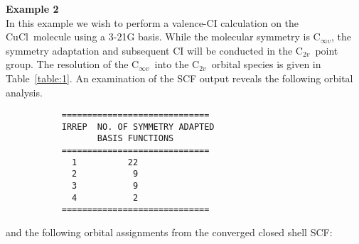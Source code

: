 \documentclass[11pt,fleqn]{article}
\newcommand{\cinfv}{\mbox{C$_{\infty v}$}}
\newcommand{\ctwov}{\mbox{C$_{2v}$}}
\newcommand{\cucl}{\mbox{CuCl}}
\begin{document}
{\bf Example 2}\\

In this example we wish to perform a valence-CI calculation on the \cucl\
molecule using a 3-21G  basis. While the molecular symmetry
is \cinfv, the symmetry adaptation  and subsequent CI 
will be conducted in the \ctwov\ point group. 
The resolution of the \cinfv\ into the \ctwov\ orbital species is given in
Table~\ref{table:1}.  An examination of the SCF output
reveals the following orbital analysis.

{
\footnotesize
\begin{verbatim}
           =============================
           IRREP  NO. OF SYMMETRY ADAPTED
                  BASIS FUNCTIONS
           =============================
             1          22
             2           9
             3           9
             4           2
           =============================
\end{verbatim}
}
and the following orbital assignments from the converged closed shell SCF:
\end{document}
